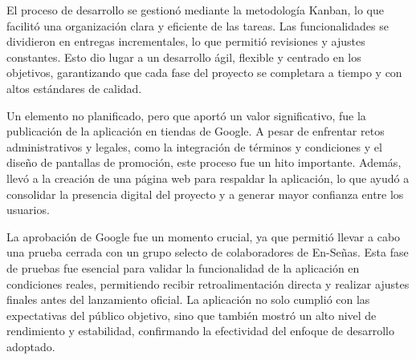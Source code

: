 El proceso de desarrollo se gestionó mediante la metodología Kanban, lo que facilitó una organización clara y eficiente de las tareas. Las funcionalidades se dividieron en entregas incrementales, lo que permitió revisiones y ajustes constantes. Esto dio lugar a un desarrollo ágil, flexible y centrado en los objetivos, garantizando que cada fase del proyecto se completara a tiempo y con altos estándares de calidad.

Un elemento no planificado, pero que aportó un valor significativo, fue la publicación de la aplicación en tiendas de Google. A pesar de enfrentar retos administrativos y legales, como la integración de términos y condiciones y el diseño de pantallas de promoción, este proceso fue un hito importante. Además, llevó a la creación de una página web para respaldar la aplicación, lo que ayudó a consolidar la presencia digital del proyecto y a generar mayor confianza entre los usuarios.

La aprobación de Google fue un momento crucial, ya que permitió llevar a cabo una prueba cerrada con un grupo selecto de colaboradores de En-Señas. Esta fase de pruebas fue esencial para validar la funcionalidad de la aplicación en condiciones reales, permitiendo recibir retroalimentación directa y realizar ajustes finales antes del lanzamiento oficial. La aplicación no solo cumplió con las expectativas del público objetivo, sino que también mostró un alto nivel de rendimiento y estabilidad, confirmando la efectividad del enfoque de desarrollo adoptado.




